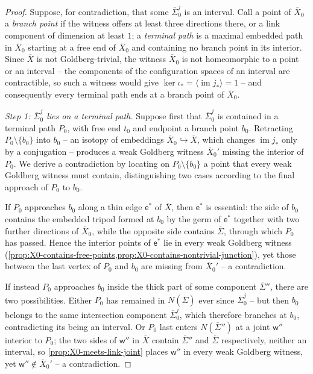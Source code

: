 \documentclass[reqno]{amsart}
\theoremstyle{definition}
\newcommand\sfe{\mathsf{e}}
\newcommand\sfw{\mathsf{w}}
\newcommand{\im}{\operatorname{im}}
\newcommand{\co}[1]{\mathopen{\langle}#1\mathclose{\rangle}} %
\renewcommand{\bar}{\overline}
\numberwithin{equation}{section}
\begin{document}
\begin{proof}
Suppose, for contradiction, that some \(\bar\Sigma_0^j\) is an
interval. Call a point of \(\bar X_0\) a \emph{branch point} if
the witness offers at least three directions there, or a link
component of dimension at least \(1\); a \emph{terminal path}
is a maximal embedded path in \(\bar X_0\) starting at a free
end of \(\bar X_0\) and containing no branch point in its
interior. Since \(\bar X\) is not Goldberg-trivial, the witness
\(\bar X_0\) is not homeomorphic to a point or an interval --
the components of the configuration spaces of an interval are
contractible, so such a witness would give
\(\ker\iota_\ast=\co{\im j_\ast}=1\) -- and consequently every
terminal path ends at a branch point of \(\bar X_0\).

\emph{Step 1: \(\bar\Sigma_0^j\) lies on a terminal path.}
Suppose first that \(\bar\Sigma_0^j\) is contained in a
terminal path \(P_0\), with free end \(t_0\) and endpoint a
branch point \(b_0\). Retracting \(P_0\setminus\{b_0\}\) into
\(b_0\) -- an isotopy of embeddings
\(\bar X_0\hookrightarrow\bar X\), which changes
\(\im j_\ast\) only by a conjugation -- produces a weak
Goldberg witness \(\bar X_0'\) missing the interior of
\(P_0\). We derive a contradiction by locating on
\(P_0\setminus\{b_0\}\) a point that every weak Goldberg
witness must contain, distinguishing two cases according to the
final approach of \(P_0\) to \(b_0\).

If \(P_0\) approaches \(b_0\) along a thin edge \(\sfe^*\) of
\(\bar X\), then \(\sfe^*\) is essential: the side of \(b_0\)
contains the embedded tripod formed at \(b_0\) by the germ of
\(\sfe^*\) together with two further directions of \(\bar X_0\),
while the opposite side contains \(\bar\Sigma\), through which
\(P_0\) has passed. Hence the interior points of \(\sfe^*\) lie in
every weak Goldberg witness
(\cref{prop:X0-contains-free-points,prop:X0-contains-nontrivial-junction}),
yet those between the last vertex of \(P_0\) and \(b_0\) are
missing from \(\bar X_0'\) -- a contradiction.

If instead \(P_0\) approaches \(b_0\) inside the thick part of
some component \(\bar\Sigma''\), there are two possibilities.
Either \(P_0\) has remained in \(N(\bar\Sigma)\) ever since
\(\bar\Sigma_0^j\) -- but then \(b_0\) belongs to the same
intersection component \(\bar\Sigma_0^j\), which therefore
branches at \(b_0\), contradicting its being an interval. Or
\(P_0\) last enters \(N(\bar\Sigma'')\) at a joint \(\sfw''\)
interior to \(P_0\); the two sides of \(\sfw''\) in \(\bar X\)
contain \(\bar\Sigma''\) and \(\bar\Sigma\) respectively,
neither an interval, so \cref{prop:X0-meets-link-joint} places
\(\sfw''\) in every weak Goldberg witness, yet
\(\sfw''\notin\bar X_0'\) -- a contradiction.


\end{proof}
\end{document}

